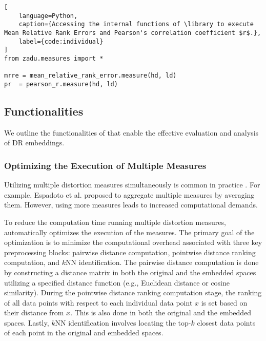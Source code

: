 \begin{lstlisting}[
    language=Python, 
    caption={Accessing the internal functions of \library to execute Mean Relative Rank Errors and Pearson's correlation coefficient $r$.},
    label={code:individual}
]
from zadu.measures import *

mrre = mean_relative_rank_error.measure(hd, ld)
pr  = pearson_r.measure(hd, ld)
\end{lstlisting}

\subsection{Functionalities}

We outline the functionalities of \library that enable the effective evaluation and analysis of DR embeddings.

\subsubsection{Optimizing the Execution of Multiple Measures}




\label{sec:optimize}

Utilizing multiple distortion measures simultaneously is common in practice \cite{jeon22vis, moor20icml}. For example, Espadoto et al. \cite{espadoto21tvcg} proposed to aggregate multiple measures by averaging them. 
However, using more measures leads to increased computational demands.

To reduce the computation time running multiple distortion measures, \library automatically optimizes the execution of the measures. 
The primary goal of the optimization is to minimize the computational overhead associated with three key preprocessing blocks: pairwise distance computation, pointwise distance ranking computation, and $k$NN identification.
The pairwise distance computation is done by constructing a distance matrix in both the original and the embedded spaces utilizing a specified distance function (e.g., Euclidean distance or cosine similarity). 
During the pointwise distance ranking computation stage, the ranking of all data points with respect to each individual data point $x$ is set based on their distance from $x$. This is also done in both the original and the embedded spaces. Lastly, $k$NN identification involves locating the top-$k$ closest data points of each point in the original and embedded spaces.

